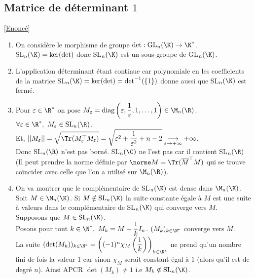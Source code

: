 \documentclass{book}
\begin{document}
	\subsection{Matrice de déterminant $1$ }
	\label{sec:matrice-de-determinant-1-etoile3}
	\textcolor{blue}{\hyperref[Matrice de déterminant 1]{[Enoncé]}}\\
	\begin{enumerate}
		\item On considère le morphisme de groupe $\det:\text{GL}_n(\K)\to \K^*$.\\
		SL$_n(\K)=\ker(\det)$ donc SL$_n(\K)$ est un sous-groupe de GL$_n(\K)$.
		\item L'application déterminant étant continue car polynomiale en les coefficients de la matrice SL$_n(\K)=\ker(\det)=\det^{-1}(\{1\})$ donne aussi que SL$_n(\K)$ est fermé.
		\item Pour $\varepsilon\in \R^*$ on pose $M_\varepsilon=\text{diag}\left(\varepsilon,\displaystyle\frac{1}{\varepsilon},1,\dots,1\right)\in \M_n(\R)$.\\
		$\forall \varepsilon\in \R^*,\ M_\varepsilon\in \text{SL}_n(\R)$.\\
		Et, $||M_\varepsilon||=\displaystyle\sqrt{\Tr(M_\varepsilon^\top M_\varepsilon)}=\sqrt{\varepsilon^2+\frac{1}{\varepsilon^2}+n-2}\underset{\varepsilon\to +\infty}{\longrightarrow}+\infty$.\\
		Donc SL$_n(\R)$ n'est pas borné. SL$_n(\C)$ ne l'est pas car il contient SL$_n(\R)$ (Il peut prendre la norme définie par $\norme M=\Tr(\overline M^\top M)$ qui se trouve coïncider avec celle que l'on a utilisé sur $\M_n(\R)$).
		\item On va montrer que le complémentaire de SL$_n(\K)$ est dense dans $\M_n(\K)$.\\
		Soit $M\in \M_n(\K)$. Si $M\notin \text{SL}_n(\K)$ la suite constante égale à $M$ est une suite à valeurs dans le complémentaire de SL$_n(\K)$ qui converge vers $M$.\\
		Supposons que $M\in \text{SL}_n(\K)$.\\
		Posons pour tout $k\in \N^*,\ M_k=M-\displaystyle\frac{1}{k}I_n$. $(M_k)_{k\in \N^*}$ converge vers $M$.\\
		La suite $(\det(M_k))_{k\in \N^*}=\left((-1)^n\chi_M\left(\displaystyle\frac{1}{k}\right)\right)_{k\in \N^*}$ ne prend qu'un nombre fini de fois la valeur $1$ car sinon $\chi_M$ serait constant égal à $1$ (alors qu'il est de degré $n$).
		Ainsi APCR $\det(M_k)\ne 1$ i.e $M_k\notin \text{SL}_n(\K)$.\\

\end{enumerate}
\end{document}
